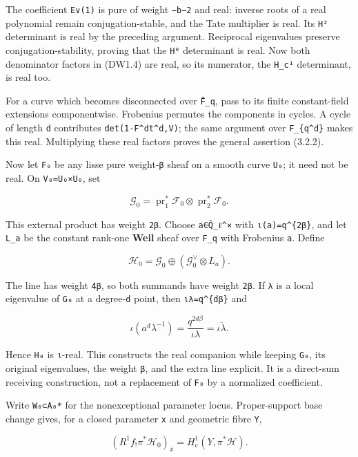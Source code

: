 \documentclass[
]{report}
\newcounter{none} %
\begin{document}
The coefficient \texttt{E∨(1)} is pure of weight \texttt{−b−2} and real:
inverse roots of a real polynomial remain conjugation-stable, and the
Tate multiplier is real. Its \texttt{H²} determinant is real by the
preceding argument. Reciprocal eigenvalues preserve
conjugation-stability, proving that the \texttt{H⁰} determinant is real.
Now both denominator factors in (DW1.4) are real, so its numerator, the
\texttt{H\_c¹} determinant, is real too.

For a curve which becomes disconnected over \texttt{F̄\_q}, pass to its
finite constant-field extensions componentwise. Frobenius permutes the
components in cycles. A cycle of length \texttt{d} contributes
\texttt{det(1-F\^{}dt\^{}d,V)}; the same argument over
\texttt{F\_\{q\^{}d\}} makes this real. Multiplying these real factors
proves the general assertion (3.2.2).

Now let \texttt{F₀} be any lisse pure weight-\texttt{β} sheaf on a
smooth curve \texttt{U₀}; it need not be real. On \texttt{V₀=U₀×U₀}, set

\[
\mathcal G_0=\operatorname{pr}_1^*\mathcal F_0
\otimes\operatorname{pr}_2^*\mathcal F_0.
\tag{DW4.2}
\]

This external product has weight \texttt{2β}. Choose
\texttt{a∈Q̄\_ℓ\^{}×} with \texttt{ι(a)=q\^{}\{2β\}}, and let
\texttt{L\_a} be the constant rank-one \textbf{Weil} sheaf over
\texttt{F\_q} with Frobenius \texttt{a}. Define

\[
\mathcal H_0=
\mathcal G_0\oplus(\mathcal G_0^\vee\otimes L_a).
\tag{DW4.3}
\]

The line has weight \texttt{4β}, so both summands have weight
\texttt{2β}. If \texttt{λ} is a local eigenvalue of \texttt{G₀} at a
degree-\texttt{d} point, then
\texttt{\textbar{}ιλ\textbar{}=q\^{}\{dβ\}} and

\[
\iota(a^d\lambda^{-1})
=\frac{q^{2d\beta}}{\iota\lambda}
=\overline{\iota\lambda}.
\tag{DW4.4}
\]

Hence \texttt{H₀} is \texttt{ι}-real. This constructs the real companion
while keeping \texttt{G₀}, its original eigenvalues, the weight
\texttt{β}, and the extra line explicit. It is a direct-sum receiving
construction, not a replacement of \texttt{F₀} by a normalized
coefficient.

Write \texttt{W₀⊂A₀*} for the nonexceptional parameter locus.
Proper-support base change gives, for a closed parameter \texttt{x} and
geometric fibre \texttt{Y},

\[
(R^1f_!\pi^*\mathcal H_0)_{\bar x}
=H_c^1(Y,\pi^*\mathcal H).
\tag{DW4.5}
\]
\end{document}
